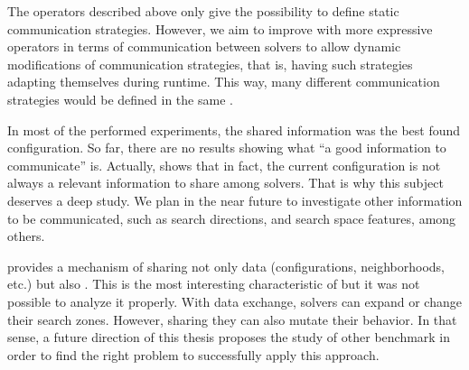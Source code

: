 The operators described above only give the possibility to define static communication strategies. However, we aim to improve \posl{} with more expressive operators in terms of communication between solvers to allow dynamic modifications of communication strategies, that is, having such strategies adapting themselves during runtime. This way, many different communication strategies would be defined in the same \soset. 


In most of the performed experiments, the shared information was the best found configuration. So far, there are no results showing what ``a good information to communicate'' is. Actually, \cite{Caniou14} shows that in fact, the current configuration is not always a relevant information to share among solvers. That is why this subject deserves a deep study. We plan in the near future to investigate other information to be communicated, such as search directions, and search space features, among others.

\posl{} provides a mechanism of sharing not only data (\ie configurations, neighborhoods, etc.) but also \oms{}. This is the most interesting characteristic of \posl{} but it was not possible to analyze it properly. With data exchange, solvers can expand or change their search zones. However, sharing \ms{} they can also mutate their behavior. In that sense, a future direction of this thesis proposes the study of other benchmark in order to find the right problem to successfully apply this approach.